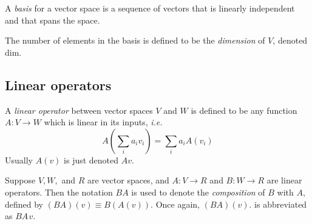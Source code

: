 \begin{definition}
A \emph{basis} for a vector space is a sequence of vectors that is linearly
independent and that spans the space.
\end{definition}

\begin{definition}
The number of elements in the basis is defined to be the \emph{dimension}  of
$V$, denoted \gls{dim}.
\end{definition}

\subsection{Linear operators}
A \emph{linear operator} between vector spaces $V$ and $W$ is defined to be any function $A : V \rightarrow W$ which is linear in its inputs, \textit{i.e.}
\begin{equation*}
  A \left( \sum_{i} a_{i} v_{i} \right) = \sum_{i} a_i A (v_{i})
\end{equation*}
Usually $A(v)$ is just denoted $A v$.

Suppose $V, W,$ and $R$ are vector spaces, and $A : V \rightarrow R$ and $B : W \rightarrow R$ are linear operators. Then the notation $BA$ is used  to denote the \emph{composition} of $B$ with $A$,
defined by $(BA)(v) \equiv B(A(v))$. Once again, $(BA)(v)$. is abbreviated as  $BA \hspace{1pt}v$.

